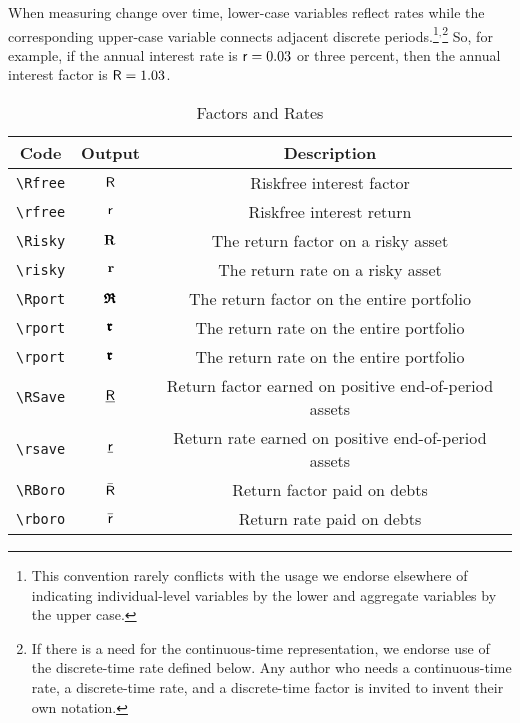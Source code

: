 
  When measuring change over time, lower-case variables reflect rates
  while the corresponding upper-case variable connects adjacent discrete periods.\footnote{This
  convention rarely conflicts with the usage we endorse elsewhere of
  indicating individual-level variables by the lower and aggregate
  variables by the upper case.}$^{,}$\footnote{If there is a need for the continuous-time
representation, we endorse use of the discrete-time rate defined below.  Any
author who needs a continuous-time rate, a discrete-time rate, and a discrete-time factor
is invited to invent their own notation.}  So, for example, if the annual interest rate is $\mathsf{r}=0.03$ or three percent, then
the annual interest factor is $\mathsf{R}=1.03$.%


\begin{table}[h]
	\centering
	\begin{tabular}{|ccc|}
		\hline
Code    & Output & Description
\\ \hline
   \verb|\Rfree| & $\mathsf{R}$     & Riskfree interest factor
\\ \verb|\rfree| & $\mathsf{r}$     & Riskfree interest return
\\ \verb|\Risky| & $\mathbf{R}$     & The return factor on a risky asset
\\ \verb|\risky| & $\mathbf{r}$     & The return rate on a risky asset
\\ \verb|\Rport| & $\pmb{\mathfrak{R}}$     & The return factor on the entire portfolio
\\ \verb|\rport| & $\pmb{\mathfrak{r}}$     & The return rate on the entire portfolio
\\ \verb|\rport| & $\pmb{\mathfrak{r}}$     & The return rate on the entire portfolio
\\ \verb|\RSave| & $\underline{\mathsf{R}}$     & Return factor earned on positive end-of-period assets
\\ \verb|\rsave| & $\underline{\mathsf{r}}$     & Return rate earned on positive end-of-period assets
\\ \verb|\RBoro| & $\bar{\mathsf{R}}$     & Return factor paid on debts
\\ \verb|\rboro| & $\bar{\mathsf{r}}$     & Return rate paid on debts
\\	\hline
	\end{tabular}
	\caption{Factors and Rates}
	\label{table:Factors}
\end{table}

